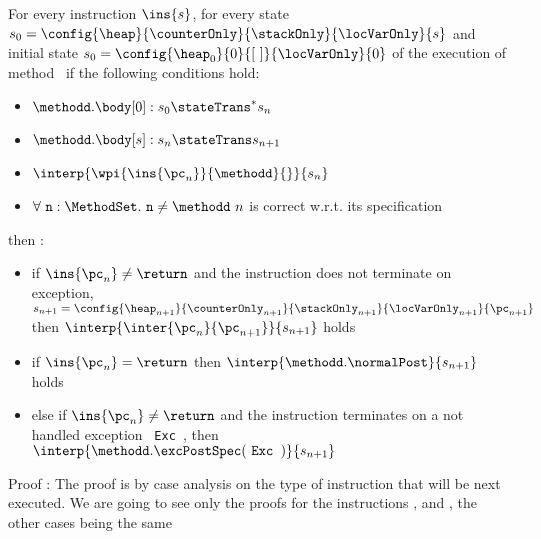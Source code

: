 \begin{lemma0} \label{lemma0}
For every instruction $\ins{s}$, for every state $s_0 =\config{\heap }{\counterOnly }{\stackOnly }{\locVarOnly }{s } $ and
initial state $s_{0} =\config{\heap_{0}  }{ 0 }{\lbrack \ \rbrack }{\locVarOnly }{ 0 } $ 
   of the execution of method \methodd \  if the following conditions hold: 
 \begin{itemize}
         \item $ \methodd.\body[0] : s_{0} \stateTrans^{*} s_n$
         \item $ \methodd.\body[s] : s_n \stateTrans s_{n+1}$
         \item $ \interp{\wpi{\ins{\pc_n}}{\methodd}{}}{s_n} $
         \item    $ \forall \mbox{ \rm \texttt{n}} : \MethodSet . \mbox{ \rm \texttt{n}}   \neq \methodd \ n$ is correct w.r.t. its specification
 \end{itemize}
  
  then : 
 \begin{itemize}
         \item if  $ \ins{\pc_n} \neq \return $ and the instruction does not terminate on exception,
	      $ s_{n+1} = \config{\heap_{n+1} }{\counterOnly_{n+1} }{ \stackOnly_{n+1}}{\locVarOnly_{n+1} }{ \pc_{n+1} }  $
	       then  $ \interp{\inter{\pc_n}{\pc_{n+1}}}{s_{n+1}}  $   holds 
        \item if  $ \ins{\pc_n} = \return $ then  $ \interp{\methodd.\normalPost}{s_{n+1}}  $   holds
	\item else if $ \ins{\pc_n } \neq \return $ and the instruction terminates on a not handled exception \mbox{ \rm\texttt{Exc }}, then
	      $ \interp{\methodd.\excPostSpec( \mbox{ \rm\texttt{Exc }} )}{ s_{n+1} }  $ 
	
  \end{itemize} 
\end{lemma0}
Proof :
The proof is by case analysis on the type of instruction that will be next executed. 
We are going to see only the proofs for the instructions \return , \load and \invoke, the other cases being the same
